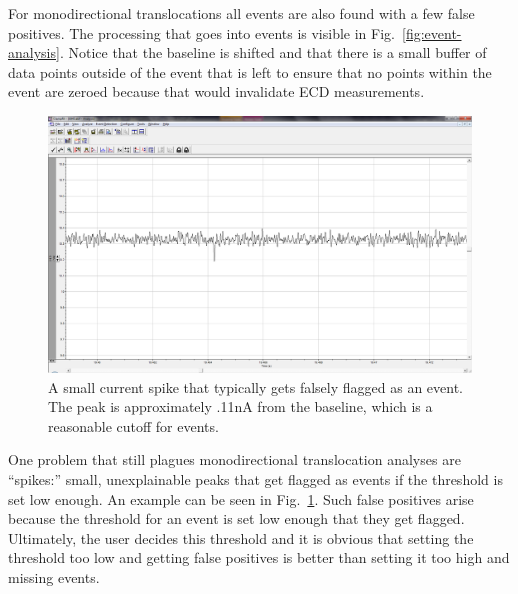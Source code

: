 \documentclass[aps,prl,preprint,groupedaddress]{revtex4}
\begin{document}
For monodirectional translocations all events are also found with a few false positives.
The processing that goes into events is visible in Fig.~\ref{fig:event-analysis}.
Notice that the baseline is shifted and that there is a small buffer of data points outside of the event that is left to ensure that no points within the event are zeroed because that would invalidate ECD measurements.

\begin{figure}[H]
\centering
\includegraphics[width=1\textwidth]{figures/false-positive-example}
\caption{A small current spike that typically gets falsely flagged as an event.
The peak is approximately .11nA from the baseline, which is a reasonable cutoff for events.}
\label{fig:spike}
\end{figure}

One problem that still plagues monodirectional translocation analyses are ``spikes:'' small, unexplainable peaks that get flagged as events if the threshold is set low enough.
An example can be seen in Fig.~\ref{fig:spike}.
Such false positives arise because the threshold for an event is set low enough that they get flagged.
Ultimately, the user decides this threshold and it is obvious that setting the threshold too low and getting false positives is better than setting it too high and missing events.
\end{document}
